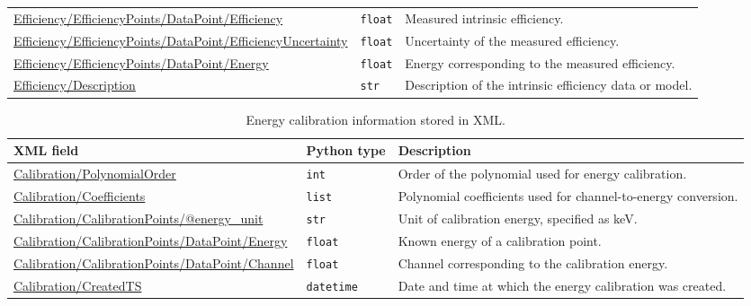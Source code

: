 \begin{table}[H]
\begin{tabular}{>{\raggedright\arraybackslash}p{}
                    >{\raggedright\arraybackslash}p{}
                    >{\raggedright\arraybackslash}p{}}
    \url{Efficiency/EfficiencyPoints/DataPoint/Efficiency}
        & \texttt{float}
        & Measured intrinsic efficiency. \\

    \url{Efficiency/EfficiencyPoints/DataPoint/EfficiencyUncertainty}
        & \texttt{float}
        & Uncertainty of the measured efficiency. \\

    \url{Efficiency/EfficiencyPoints/DataPoint/Energy}
        & \texttt{float}
        & Energy corresponding to the measured efficiency. \\

    \url{Efficiency/Description}
        & \texttt{str}
        & Description of the intrinsic efficiency data or model. \\

    \bottomrule
    \end{tabular}
\end{table}

\begin{table}[H]
    \centering
    \caption{Energy calibration information stored in XML.}
    \label{tab:instrument-calibration-xml}
    \begin{tabular}{>{\raggedright\arraybackslash}p{}
                    >{\raggedright\arraybackslash}p{}
                    >{\raggedright\arraybackslash}p{}}
    \toprule
    \textbf{XML field} & \textbf{Python type} & \textbf{Description} \\ \midrule

    \url{Calibration/PolynomialOrder}
        & \texttt{int}
        & Order of the polynomial used for energy calibration. \\

    \url{Calibration/Coefficients}
        & \texttt{list}
        & Polynomial coefficients used for channel-to-energy conversion. \\

    \url{Calibration/CalibrationPoints/@energy_unit}
        & \texttt{str}
        & Unit of calibration energy, specified as keV. \\

    \url{Calibration/CalibrationPoints/DataPoint/Energy}
        & \texttt{float}
        & Known energy of a calibration point. \\

    \url{Calibration/CalibrationPoints/DataPoint/Channel}
        & \texttt{float}
        & Channel corresponding to the calibration energy. \\

    \url{Calibration/CreatedTS}
        & \texttt{datetime}
        & Date and time at which the energy calibration was created. \\

    \bottomrule
    \end{tabular}
\end{table}





